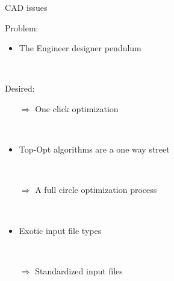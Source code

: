 
\begin{frame}{CAD issues}

	\begin{multicols}{2}
		\begin{block}{Problem:}{
		\begin{itemize}		
			\item The Engineer designer pendulum			
		\end{itemize}~\\
		}
		\end{block}
	
		\vfill
		\columnbreak


		\begin{block}{Desired:}{
		\begin{itemize}		
			\item[$\Rightarrow$] One click optimization				
		\end{itemize}~\\
		}
		\end{block}
				
		\end{multicols}
		\pause
		
	\begin{multicols}{2}

		\begin{itemize}
			\item Top-Opt algorithms are a one way street
		\end{itemize}~\\
		\vfill
		\columnbreak
		\begin{itemize}
			\item[$\Rightarrow$] A full circle optimization process	
		\end{itemize}~\\			
		\end{multicols}
		\pause
	\begin{multicols}{2}

		\begin{itemize}
			\item Exotic input file types
		\end{itemize}~\\
		\vfill
		\columnbreak
		\begin{itemize}
			\item[$\Rightarrow$] Standardized input files	
		\end{itemize}~\\			
		\end{multicols}

\end{frame}	

